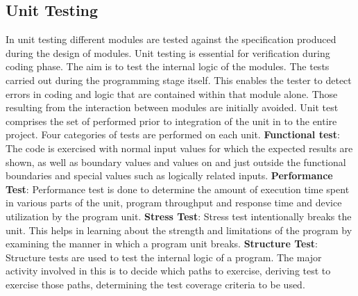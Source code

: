 \subsection*{Unit Testing}
In unit testing different modules are tested against the specification produced during the design of modules. Unit testing is essential for verification during coding phase. The aim is to test the internal logic of the modules. The tests carried out during the programming stage itself. 
\newline
This enables the tester to detect errors in coding and logic that are contained within that module alone. Those resulting from the interaction between modules are initially avoided. Unit test comprises the set of performed prior to integration of the unit in to the entire project. Four categories of tests are performed on each unit.
\newline
\textbf{Functional test}:  The code is exercised with normal input values for which the expected results are shown, as well as boundary values and values on and just outside the functional boundaries and special values such as logically related inputs. 
\newline
\textbf{Performance Test}:  Performance test is done to determine the amount of execution time spent in various parts of the unit, program throughput and response time and device utilization by the program unit. 
\newline
\textbf{Stress Test}: Stress test intentionally breaks the unit. This helps in learning about the strength and limitations of the program by examining the manner in which a program unit breaks. 
\newline
\textbf{Structure Test}: Structure tests are used to test the internal logic of a program. The major activity involved in this is to decide which paths to exercise, deriving test to exercise those paths, determining the test coverage criteria to be used. 

